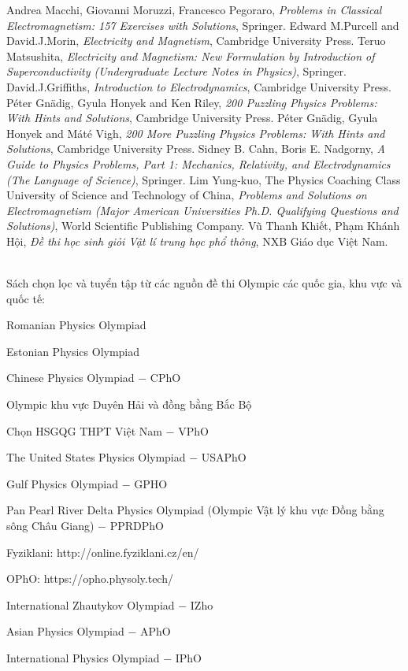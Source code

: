 \begin{thebibliography}{}
    \bibitem{} Andrea Macchi, Giovanni Moruzzi, Francesco Pegoraro, \textit{Problems in Classical Electromagnetism: 157 Exercises with Solutions}, Springer.
    \bibitem{} Edward M.Purcell and David.J.Morin, \textit{Electricity and Magnetism}, Cambridge University Press.
    \bibitem{} Teruo Matsushita, \textit{Electricity and Magnetism: New Formulation by Introduction of Superconductivity (Undergraduate Lecture Notes in Physics)}, Springer.
    \bibitem{} David.J.Griffiths, \textit{Introduction to Electrodynamics}, Cambridge University Press.
    \bibitem{} Péter Gnädig, Gyula Honyek and Ken Riley, \textit{200 Puzzling Physics Problems: With Hints and Solutions}, Cambridge University Press.
    \bibitem{} Péter Gnädig, Gyula Honyek and Máté Vigh, \textit{200 More Puzzling Physics Problems: With Hints and Solutions}, Cambridge University Press.
    \bibitem{} Sidney B. Cahn, Boris E. Nadgorny, \textit{A Guide to Physics Problems, Part 1: Mechanics, Relativity, and Electrodynamics (The Language of Science)}, Springer.
    \bibitem{} Lim Yung-kuo, The Physics Coaching Class University of Science and Technology of China, \textit{Problems and Solutions on Electromagnetism (Major American Universities Ph.D. Qualifying Questions and Solutions)}, World Scientific Publishing Company. 
    \bibitem{} Vũ Thanh Khiết, Phạm Khánh Hội, \textit{Đề thi học sinh giỏi Vật lí trung học phổ thông}, NXB Giáo dục Việt Nam.
\end{thebibliography}
\hfill \\
    Sách chọn lọc và tuyển tập từ các nguồn đề thi Olympic các quốc gia, khu vực và quốc tế:
    \setcounter{enumiv}{0}
    \begin{enumerate}[{[}1{]}]
    \item Romanian Physics Olympiad
    \item Estonian Physics Olympiad
    \item Chinese Physics Olympiad $-$ CPhO
    \item Olympic khu vực Duyên Hải và đồng bằng Bắc Bộ
    \item Chọn HSGQG THPT Việt Nam $-$ VPhO 
    \item The United States Physics Olympiad $-$ USAPhO
    \item Gulf Physics Olympiad $-$ GPHO
    \item Pan Pearl River Delta Physics Olympiad (Olympic Vật lý khu vực Đồng bằng sông Châu Giang) $-$ PPRDPhO
    \item Fyziklani: http://online.fyziklani.cz/en/
    \item OPhO: https://opho.physoly.tech/ 
    \item International Zhautykov Olympiad $-$ IZho
    \item Asian Physics Olympiad $-$ APhO
    \item International Physics Olympiad $-$ IPhO
    \end{enumerate}
    
